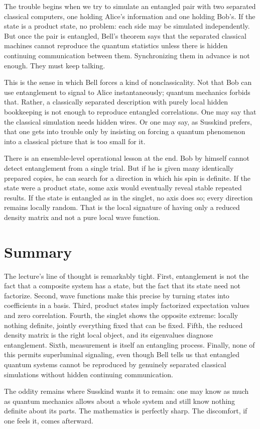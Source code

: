 The trouble begins when we try to simulate an entangled pair with two separated classical computers, one holding Alice's information and one holding Bob's. If the state is a product state, no problem: each side may be simulated independently. But once the pair is entangled, Bell's theorem says that the separated classical machines cannot reproduce the quantum statistics unless there is hidden continuing communication between them. Synchronizing them in advance is not enough. They must keep talking.

This is the sense in which Bell forces a kind of nonclassicality. Not that Bob can use entanglement to signal to Alice instantaneously; quantum mechanics forbids that. Rather, a classically separated description with purely local hidden bookkeeping is not enough to reproduce entangled correlations. One may say that the classical simulation needs hidden wires. Or one may say, as Susskind prefers, that one gets into trouble only by insisting on forcing a quantum phenomenon into a classical picture that is too small for it.

There is an ensemble-level operational lesson at the end. Bob by himself cannot detect entanglement from a single trial. But if he is given many identically prepared copies, he can search for a direction in which his spin is definite. If the state were a product state, some axis would eventually reveal stable repeated results. If the state is entangled as in the singlet, no axis does so; every direction remains locally random. That is the local signature of having only a reduced density matrix and not a pure local wave function.

\section{Summary}

The lecture's line of thought is remarkably tight. First, entanglement is not the fact that a composite system has a state, but the fact that its state need not factorize. Second, wave functions make this precise by turning states into coefficients in a basis. Third, product states imply factorized expectation values and zero correlation. Fourth, the singlet shows the opposite extreme: locally nothing definite, jointly everything fixed that can be fixed. Fifth, the reduced density matrix is the right local object, and its eigenvalues diagnose entanglement. Sixth, measurement is itself an entangling process. Finally, none of this permits superluminal signaling, even though Bell tells us that entangled quantum systems cannot be reproduced by genuinely separated classical simulations without hidden continuing communication.

The oddity remains where Susskind wants it to remain: one may know as much as quantum mechanics allows about a whole system and still know nothing definite about its parts. The mathematics is perfectly sharp. The discomfort, if one feels it, comes afterward.